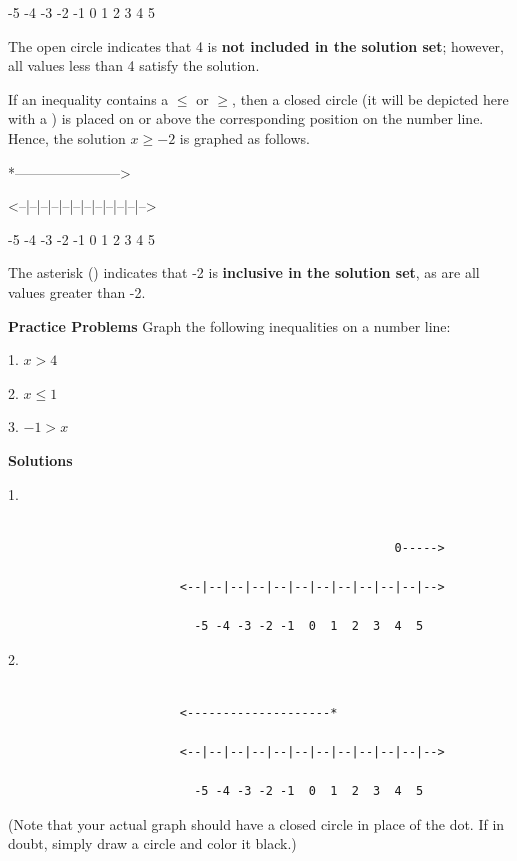                           -5 -4 -3 -2 -1  0  1  2  3  4  5



The open circle indicates that 4 is \textbf{not included in the solution set}; however,
all values less than 4 satisfy the solution.



If an inequality contains a $\le$ or $\ge$, then a closed circle (it will be depicted here
with a \*) is placed on or above the corresponding position on the number line. Hence, the
solution $x \ge -2$ is graphed as follows.



                                    *----------------------->

                        <--|--|--|--|--|--|--|--|--|--|--|-->

                          -5 -4 -3 -2 -1  0  1  2  3  4  5



The asterisk (\*) indicates that -2 is \textbf{inclusive in the solution set}, as are all
values greater than -2.



\textbf{Practice Problems}
Graph the following inequalities on a number line:

1. $x > 4$

2. $x \le 1$

3. $-1 > x$


\textbf{Solutions}



1.
\begin{verbatim}

                                                      0----->

                        <--|--|--|--|--|--|--|--|--|--|--|-->

                          -5 -4 -3 -2 -1  0  1  2  3  4  5
\end{verbatim}


2.
\begin{verbatim}

                        <--------------------*

                        <--|--|--|--|--|--|--|--|--|--|--|-->

                          -5 -4 -3 -2 -1  0  1  2  3  4  5
\end{verbatim}



(Note that your actual graph should have a closed circle in place of the dot. If in doubt,
simply draw a circle and color it black.)



